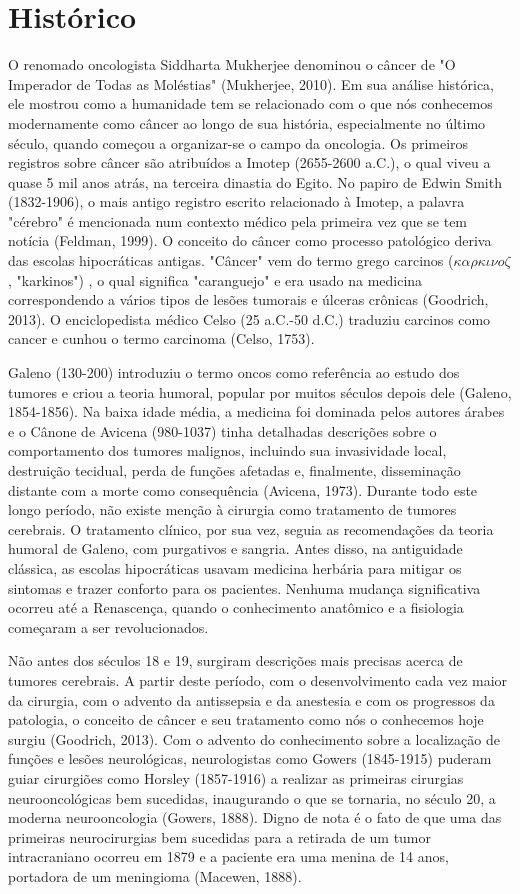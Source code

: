 \documentclass[graybox]{svmult}
\begin{document}
\section{Histórico}
O renomado oncologista Siddharta Mukherjee denominou o câncer de "O Imperador de Todas as Moléstias" (Mukherjee, 2010). Em sua análise histórica, ele mostrou como a humanidade tem se relacionado com o que nós conhecemos modernamente como câncer ao longo de sua história, especialmente no último século, quando começou a organizar-se o campo da oncologia. Os primeiros registros sobre câncer são atribuídos a Imotep (2655-2600 a.C.), o qual viveu a quase 5 mil anos atrás, na terceira dinastia do Egito. No papiro de Edwin Smith (1832-1906), o mais antigo registro escrito relacionado à Imotep, a palavra "cérebro" é mencionada num contexto médico pela primeira vez que se tem notícia (Feldman, 1999). O conceito do câncer como processo patológico deriva das escolas hipocráticas antigas. "Câncer" vem do termo grego carcinos (\(\kappa \alpha \rho \kappa \iota \nu o \zeta\), "karkinos") , o qual significa "caranguejo" e era usado na medicina correspondendo a vários tipos de lesões tumorais e úlceras crônicas (Goodrich, 2013). O enciclopedista médico Celso (25 a.C.-50 d.C.) traduziu carcinos como cancer e cunhou o termo carcinoma (Celso, 1753). 

Galeno (130-200) introduziu o termo oncos como referência ao estudo dos tumores e criou a teoria humoral, popular por muitos séculos depois dele (Galeno, 1854-1856). Na baixa idade média, a medicina foi dominada pelos autores árabes e o Cânone de Avicena (980-1037) tinha detalhadas descrições sobre o comportamento dos tumores malignos, incluindo sua invasividade local, destruição tecidual, perda de funções afetadas e, finalmente, disseminação distante com a morte como consequência (Avicena, 1973). Durante todo este longo período, não existe menção à cirurgia como tratamento de tumores cerebrais. O tratamento clínico, por sua vez, seguia as recomendações da teoria humoral de Galeno, com purgativos e sangria. Antes disso, na antiguidade clássica, as escolas hipocráticas usavam medicina herbária para mitigar os sintomas e trazer conforto para os pacientes. Nenhuma mudança significativa ocorreu até a Renascença, quando o conhecimento anatômico e a fisiologia começaram a ser revolucionados. 

Não antes dos séculos 18 e 19, surgiram descrições mais precisas acerca de tumores cerebrais. A partir deste período, com o desenvolvimento cada vez maior da cirurgia, com o advento da antissepsia e da anestesia e com os progressos da patologia, o conceito de câncer e seu tratamento como nós o conhecemos hoje surgiu (Goodrich, 2013). Com o advento do conhecimento sobre a localização de funções e lesões neurológicas, neurologistas como Gowers (1845-1915) puderam guiar cirurgiões como Horsley (1857-1916) a realizar as primeiras cirurgias neurooncológicas bem sucedidas, inaugurando o que se tornaria, no século 20, a moderna neurooncologia (Gowers, 1888). Digno de nota é o fato de que uma das primeiras neurocirurgias bem sucedidas para a retirada de um tumor intracraniano ocorreu em 1879 e a paciente era uma menina de 14 anos, portadora de um meningioma (Macewen, 1888).
\end{document}
